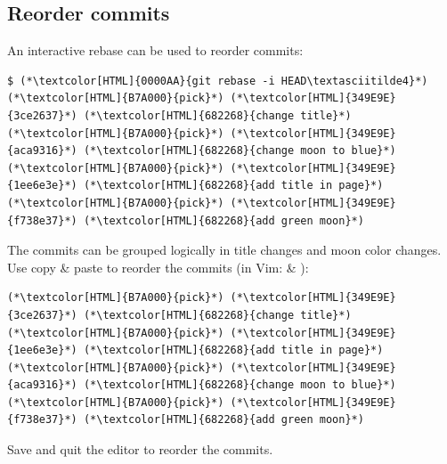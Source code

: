 \subsection{Reorder commits}
\begin{frame}[fragile]
  \subslidetitle
  An interactive rebase can be used to reorder commits:

  \begin{lstlisting}
$ (*\textcolor[HTML]{0000AA}{git rebase -i HEAD\textasciitilde4}*)
(*\textcolor[HTML]{B7A000}{pick}*) (*\textcolor[HTML]{349E9E}{3ce2637}*) (*\textcolor[HTML]{682268}{change title}*)
(*\textcolor[HTML]{B7A000}{pick}*) (*\textcolor[HTML]{349E9E}{aca9316}*) (*\textcolor[HTML]{682268}{change moon to blue}*)
(*\textcolor[HTML]{B7A000}{pick}*) (*\textcolor[HTML]{349E9E}{1ee6e3e}*) (*\textcolor[HTML]{682268}{add title in page}*)
(*\textcolor[HTML]{B7A000}{pick}*) (*\textcolor[HTML]{349E9E}{f738e37}*) (*\textcolor[HTML]{682268}{add green moon}*)
\end{lstlisting}

  The commits can be grouped logically in title changes and moon color changes.\\
  Use copy \& paste to reorder the commits (in Vim:  \& ):

  \begin{lstlisting}
(*\textcolor[HTML]{B7A000}{pick}*) (*\textcolor[HTML]{349E9E}{3ce2637}*) (*\textcolor[HTML]{682268}{change title}*)
(*\textcolor[HTML]{B7A000}{pick}*) (*\textcolor[HTML]{349E9E}{1ee6e3e}*) (*\textcolor[HTML]{682268}{add title in page}*)
(*\textcolor[HTML]{B7A000}{pick}*) (*\textcolor[HTML]{349E9E}{aca9316}*) (*\textcolor[HTML]{682268}{change moon to blue}*)
(*\textcolor[HTML]{B7A000}{pick}*) (*\textcolor[HTML]{349E9E}{f738e37}*) (*\textcolor[HTML]{682268}{add green moon}*)
\end{lstlisting}

  Save and quit the editor to reorder the commits.
\end{frame}


